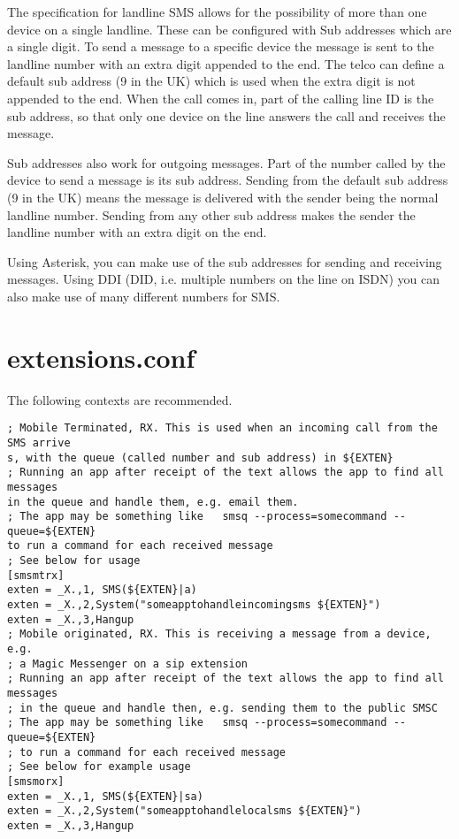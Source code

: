    The specification for landline SMS allows for the possibility of more
   than one device on a single landline. These can be configured with Sub
   addresses which are a single digit. To send a message to a specific
   device the message is sent to the landline number with an extra digit
   appended to the end. The telco can define a default sub address (9 in
   the UK) which is used when the extra digit is not appended to the end.
   When the call comes in, part of the calling line ID is the sub
   address, so that only one device on the line answers the call and
   receives the message.

   Sub addresses also work for outgoing messages. Part of the number
   called by the device to send a message is its sub address. Sending
   from the default sub address (9 in the UK) means the message is
   delivered with the sender being the normal landline number. Sending
   from any other sub address makes the sender the landline number with
   an extra digit on the end.

   Using Asterisk, you can make use of the sub addresses for sending and
   receiving messages. Using DDI (DID, i.e. multiple numbers on the line
   on ISDN) you can also make use of many different numbers for SMS.

\section{extensions.conf}

   The following contexts are recommended.
\begin{verbatim}
; Mobile Terminated, RX. This is used when an incoming call from the SMS arrive
s, with the queue (called number and sub address) in ${EXTEN}
; Running an app after receipt of the text allows the app to find all messages 
in the queue and handle them, e.g. email them.
; The app may be something like   smsq --process=somecommand --queue=${EXTEN}  
to run a command for each received message
; See below for usage
[smsmtrx]
exten = _X.,1, SMS(${EXTEN}|a)
exten = _X.,2,System("someapptohandleincomingsms ${EXTEN}")
exten = _X.,3,Hangup
; Mobile originated, RX. This is receiving a message from a device, e.g. 
; a Magic Messenger on a sip extension
; Running an app after receipt of the text allows the app to find all messages 
; in the queue and handle then, e.g. sending them to the public SMSC
; The app may be something like   smsq --process=somecommand --queue=${EXTEN}  
; to run a command for each received message
; See below for example usage
[smsmorx]
exten = _X.,1, SMS(${EXTEN}|sa)
exten = _X.,2,System("someapptohandlelocalsms ${EXTEN}")
exten = _X.,3,Hangup
\end{verbatim}

